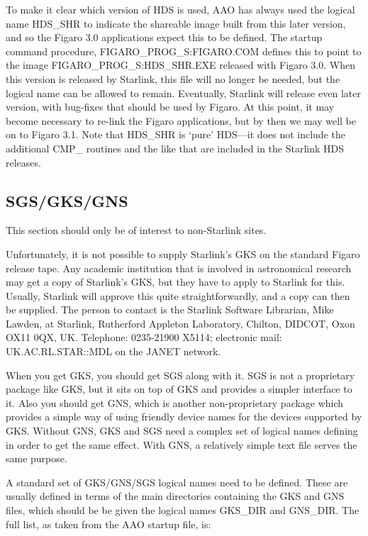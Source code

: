 To make it clear which version of HDS is used, AAO has always used the logical
name HDS\_SHR to indicate the shareable image built from this later version,
and so the Figaro 3.0 applications expect this to be defined. The startup
command procedure, FIGARO\_PROG\_S:FIGARO.COM defines this to point to the
image FIGARO\_PROG\_S:HDS\_SHR.EXE released with Figaro 3.0. When this version
is released by Starlink, this file will no longer be needed, but the  logical
name can be allowed to remain. Eventually, Starlink will release even later
version, with bug-fixes that should be used by Figaro. At this point, it may
become necessary to re-link the Figaro applications, but by then we may well be
on to Figaro 3.1. Note that HDS\_SHR is `pure' HDS---it  does not include the
additional CMP\_ routines and the like that are included in the Starlink HDS
releases.

\subsection{SGS/GKS/GNS}

This section should only be of interest to non-Starlink sites.

Unfortunately, it is not possible to supply Starlink's GKS on the standard
Figaro  release  tape. Any  academic  institution  that is involved in
astronomical research may get a copy  of  Starlink's  GKS, but they have to
apply to Starlink for this. Usually, Starlink will approve this quite
straightforwardly, and a copy can then be supplied. The person to contact is
the Starlink Software Librarian, Mike Lawden, at Starlink, Rutherford Appleton
Laboratory,  Chilton,  DIDCOT,  Oxon OX11 0QX, UK. Telephone:   0235-21900
X5114;  electronic  mail: UK.AC.RL.STAR::MDL on the JANET network.

When you get GKS, you should get SGS along with it.  SGS is not a proprietary
package like GKS, but it sits on top of GKS and provides a simpler interface to
it.  Also you should get GNS,  which  is  another non-proprietary  package
which provides a simple way of using friendly device names for the devices
supported by GKS.  Without GNS,  GKS  and SGS  need  a complex set of logical
names defining in order to get the same effect.  With GNS, a relatively simple
text file serves the  same purpose.

A standard set of GKS/GNS/SGS logical names need to be defined. These are
usually defined in terms of the main directories containing the GKS and GNS
files, which should be be given the logical names GKS\_DIR and GNS\_DIR. The
full list, as taken from the AAO startup file, is:

